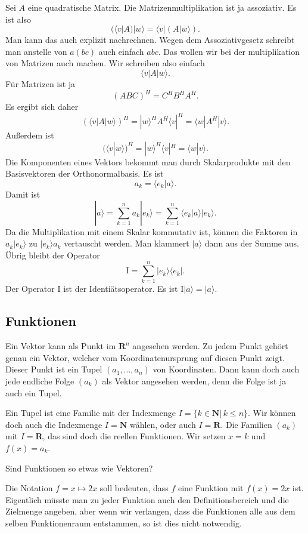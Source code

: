 \documentclass[a4paper,10pt,fleqn,twocolumn,twoside]{article}
\begin{document}
Sei \(A\) eine quadratische Matrix. Die Matrizenmultiplikation ist
ja assoziativ. Es ist also
\[(\langle v|A)|w\rangle = \langle v|(A|w\rangle).\]
Man kann das auch explizit nachrechnen. Wegen dem Assoziativgesetz
schreibt man anstelle von \(a(bc)\) auch einfach \(abc\). Das wollen
wir bei der multiplikation von Matrizen auch machen. Wir schreiben also einfach
\[\langle v|A|w\rangle.\]
Für Matrizen ist ja
\[(ABC)^H = C^HB^HA^H.\]
Es ergibt sich daher
\[(\langle v|A|w\rangle)^H = |w\rangle^H A^H \langle v|^H
= \langle w|A^H|v\rangle.\]
Außerdem ist
\[(\langle v|w\rangle)^H = |w\rangle^H\langle v|^H
= \langle w|v\rangle.\]
Die Komponenten eines Vektors bekommt man durch Skalarprodukte mit
den Basisvektoren der Orthonormalbasis. Es ist
\[a_k = \langle e_k|a\rangle.\]
Damit ist
\[|a\rangle = \sum_{k=1}^n a_k |e_k\rangle
= \sum_{k=1}^n \langle e_k|a\rangle |e_k\rangle.\]
Da die Multiplikation mit einem Skalar kommutativ ist, können die
Faktoren in \(a_k|e_k\rangle\) zu \(|e_k\rangle a_k\) vertauscht
werden. Man klammert \(|a\rangle\) dann aus der Summe aus.
Übrig bleibt der Operator
\[\mathrm I = \sum_{k=1}^n |e_k\rangle\langle e_k|.\]
Der Operator \(\mathrm I\) ist der Identiätsoperator. Es ist \(\mathrm I|a\rangle = |a\rangle\).

\subsection{Funktionen}

Ein Vektor kann als Punkt im \(\mathbf R^n\) angesehen werden.
Zu jedem Punkt gehört genau ein Vektor, welcher vom
Koordinatenursprung auf diesen Punkt zeigt. Dieser Punkt ist
ein Tupel \((a_1,\ldots,a_n)\) von Koordinaten. Dann kann doch auch
jede endliche Folge \((a_k)\) als Vektor angesehen werden, denn die
Folge ist ja auch ein Tupel.

Ein Tupel ist eine Familie mit der Indexmenge
\(I=\{k\in\mathbf N|\,k\leq n\}.\) Wir können doch auch die
Indexmenge \(I=\mathbf N\) wählen, oder auch \(I=\mathbf R\).
Die Familien \((a_k)\) mit \(I=\mathbf R\), das sind doch die
reellen Funktionen. Wir setzen \(x=k\) und \(f(x)=a_k\).

Sind Funktionen so etwas wie Vektoren?

Die Notation \(f=x\mapsto 2x\) soll bedeuten, dass \(f\) eine
Funktion mit \(f(x)=2x\) ist. Eigentlich müsste man zu jeder Funktion
auch den Definitionsbereich und die Zielmenge angeben, aber wenn
wir verlangen, dass die Funktionen alle aus dem selben Funktionenraum
entstammen, so ist dies nicht notwendig.
\end{document}
